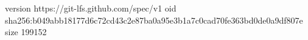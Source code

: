 version https://git-lfs.github.com/spec/v1
oid sha256:b049abb18177d6c72cd43c2e87ba0a95e3b1a7c0cad70fe363bd0de0a9df807e
size 199152
